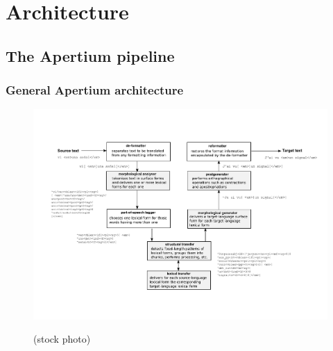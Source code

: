 \documentclass[notes=hide]{beamer}
\begin{document}
\section{Architecture}
\subsection{The Apertium pipeline}
\begin{frame}\frametitle{General Apertium architecture}
  \begin{figure}[ht]
    \textheight
    \hspace*{-0.03\textwidth}
    \centerline{\includegraphics[width=1.2\textwidth]{apertium-general-architecture}}
    \tiny{(stock photo)}
    \label{fig:general-architecture}
  \end{figure}
\end{frame}
\end{document}
